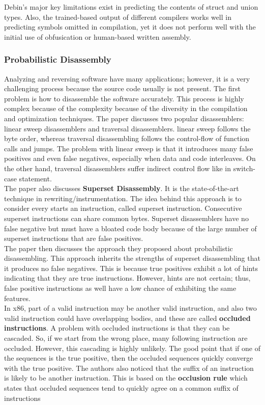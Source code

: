 \documentclass[conference,a4paper]{IEEEtran}
\begin{document}
Debin's major key limitations exist in predicting the contents of struct and union types. Also, the trained-based output of different compilers works well in predicting symbols omitted in compilation, yet it does not perform well with the initial use of obfusication or human-based written assembly.


\subsubsection{Probabilistic Disassembly}
Analyzing and reversing software have many applications; however, it is a very challenging process because the source code usually is not present. The first problem is how to disassemble the software accurately. This process is highly complex because of the complexity because of the diversity in the compilation and optimization techniques. The paper discusses two popular disassemblers: linear sweep disassemblers and traversal disassemblers. linear sweep follows the byte order, whereas traversal disassembling follows the control-flow of function calls and jumps. The problem with linear sweep is that it introduces many false positives and even false negatives, especially when data and code interleaves. On the other hand, traversal disassemblers suffer indirect control flow like in switch-case statement. \\

\noindent The paper also discusses \textbf{Superset Disassembly}. It is the state-of-the-art technique in rewriting/instrumentation. The idea behind this approach is to consider every starts an instruction, called superset instruction. Consecutive superset instructions can share common bytes. Superset disassemblers have no false negative but must have a bloated code body because of the large number of superset instructions that are false positives.\\

\noindent The paper then discusses the approach they proposed about probabilistic disassembling. This approach inherits the strengths of superset disassembling that it produces no false negatives. This is because true positives exhibit a lot of hints indicating that they are true instructions. However, hints are not certain; thus, false positive instructions as well have a low chance of exhibiting the same features. \\

\noindent In x86, part of a valid instruction may be another valid instruction, and also two valid instruction could have overlapping bodies, and these are called \textbf{occluded instructions}. A problem with occluded instructions is that they can be cascaded. So, if we start from the wrong place, many following instruction are occluded. However, this cascading is highly unlikely. The good point that if one of the sequences is the true positive, then the occluded sequences quickly converge with the true positive. The authors also noticed that the suffix of an instruction is likely to be another instruction. This is based on the \textbf{occlusion rule} which states that occluded sequences tend to quickly agree on a common suffix of instructions\\
\end{document}
